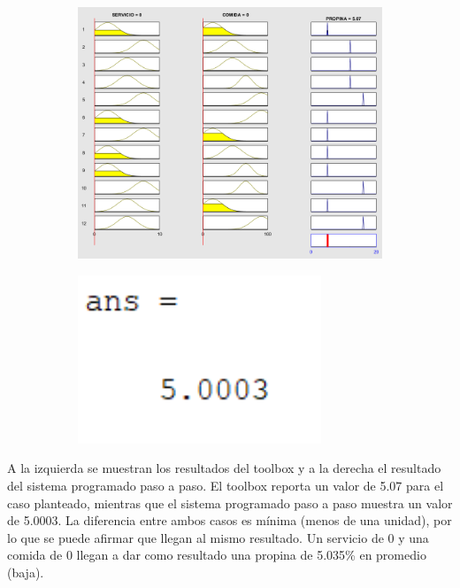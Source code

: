 \documentclass[11pt, letterpaper]{article}
\begin{document}
\begin{figure}[h]
	\centering
	\begin{subfigure}{0.40\textwidth} %
		\centering
		\includegraphics[width=1.4\textwidth]{IMG/RP11.png}
		\label{fig:G3}
	\end{subfigure}
	\hfill
	\begin{subfigure}{0.42\textwidth} %
		\centering
		\includegraphics[width=0.8\textwidth]{IMG/M11.png}
		\label{fig:G4}
	\end{subfigure}
	\label{fig:comparacion2}
\end{figure}

A la izquierda se muestran los resultados del toolbox y a la derecha el resultado del sistema programado paso a paso. El toolbox reporta un valor de 5.07 para el caso planteado, mientras que el sistema programado paso a paso muestra un valor de 5.0003. La diferencia entre ambos casos es mínima (menos de una unidad), por lo que se puede afirmar que llegan al mismo resultado. Un servicio de 0 y una comida de 0 llegan a dar como resultado una propina de 5.035\% en promedio (baja).
\end{document}
